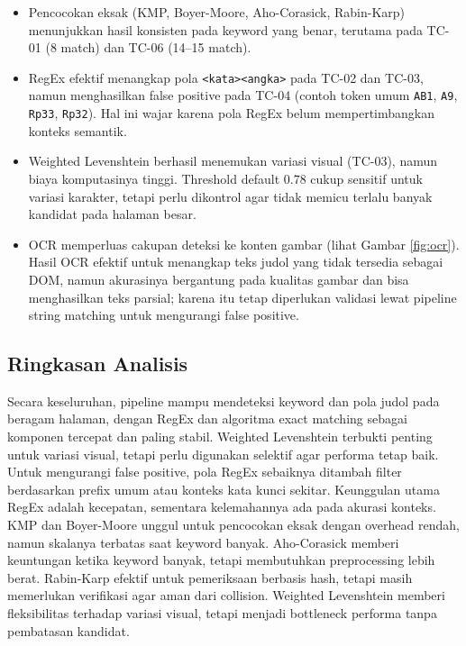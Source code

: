 \begin{itemize}
	\item Pencocokan eksak (KMP, Boyer-Moore, Aho-Corasick, Rabin-Karp)
	menunjukkan hasil konsisten pada keyword yang benar, terutama pada TC-01
	(8 match) dan TC-06 (14--15 match).
	\item RegEx efektif menangkap pola \texttt{<kata><angka>} pada TC-02 dan
	TC-03, namun menghasilkan false positive pada TC-04 (contoh token umum
	\texttt{AB1}, \texttt{A9}, \texttt{Rp33}, \texttt{Rp32}). Hal ini wajar
	karena pola RegEx belum mempertimbangkan konteks semantik.
	\item Weighted Levenshtein berhasil menemukan variasi visual (TC-03),
	namun biaya komputasinya tinggi. Threshold default 0.78 cukup sensitif
	untuk variasi karakter, tetapi perlu dikontrol agar tidak memicu terlalu
	banyak kandidat pada halaman besar.
	\item OCR memperluas cakupan deteksi ke konten gambar (lihat Gambar
	\ref{fig:ocr}). Hasil OCR efektif untuk menangkap teks judol yang tidak
	tersedia sebagai DOM, namun akurasinya bergantung pada kualitas gambar
	dan bisa menghasilkan teks parsial; karena itu tetap diperlukan validasi
	lewat pipeline string matching untuk mengurangi false positive.
\end{itemize}

\subsection{Ringkasan Analisis}

Secara keseluruhan, pipeline mampu mendeteksi keyword dan pola judol pada
beragam halaman, dengan RegEx dan algoritma exact matching sebagai komponen
tercepat dan paling stabil. Weighted Levenshtein terbukti penting untuk
variasi visual, tetapi perlu digunakan selektif agar performa tetap baik.
Untuk mengurangi false positive, pola RegEx sebaiknya ditambah filter
berdasarkan prefix umum atau konteks kata kunci sekitar.
Keunggulan utama RegEx adalah kecepatan, sementara kelemahannya ada pada
akurasi konteks. KMP dan Boyer-Moore unggul untuk pencocokan eksak dengan
overhead rendah, namun skalanya terbatas saat keyword banyak. Aho-Corasick
memberi keuntungan ketika keyword banyak, tetapi membutuhkan preprocessing
lebih berat. Rabin-Karp efektif untuk pemeriksaan berbasis hash, tetapi
masih memerlukan verifikasi agar aman dari collision. Weighted Levenshtein
memberi fleksibilitas terhadap variasi visual, tetapi menjadi bottleneck
performa tanpa pembatasan kandidat.
